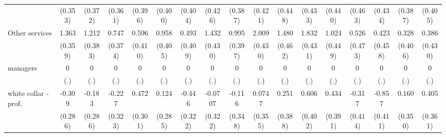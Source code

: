 {\begin{tabular}{l*{16}{c}}
                    &     (0.353)         &     (0.372)         &     (0.361)         &     (0.396)         &     (0.400)         &     (0.404)         &     (0.426)         &     (0.387)         &     (0.421)         &     (0.448)         &     (0.433)         &     (0.440)         &     (0.463)         &     (0.434)         &     (0.387)         &     (0.405)         \\
[1em]
Other services      &       1.363\sym{***}&       1.212\sym{**} &       0.747\sym{*}  &       0.596         &       0.958\sym{*}  &       0.493         &       1.432\sym{***}&       0.995\sym{*}  &       2.009\sym{***}&       1.480\sym{**} &       1.832\sym{***}&       1.024\sym{*}  &       0.526         &       0.423         &       0.328         &       0.386         \\
                    &     (0.359)         &     (0.383)         &     (0.374)         &     (0.410)         &     (0.405)         &     (0.409)         &     (0.430)         &     (0.397)         &     (0.430)         &     (0.462)         &     (0.431)         &     (0.449)         &     (0.473)         &     (0.458)         &     (0.406)         &     (0.430)         \\
[1em]
managers            &           0         &           0         &           0         &           0         &           0         &           0         &           0         &           0         &           0         &           0         &           0         &           0         &           0         &           0         &           0         &           0         \\
                    &         (.)         &         (.)         &         (.)         &         (.)         &         (.)         &         (.)         &         (.)         &         (.)         &         (.)         &         (.)         &         (.)         &         (.)         &         (.)         &         (.)         &         (.)         &         (.)         \\
[1em]
white collar - prof.&      -0.309         &      -0.183         &      -0.227         &       0.472         &       0.124         &      -0.446         &     -0.0707         &      -0.116         &      0.0747         &       0.251         &       0.606         &       0.434         &      -0.317         &      -0.857\sym{*}  &       0.160         &       0.405         \\
                    &     (0.286)         &     (0.286)         &     (0.323)         &     (0.301)         &     (0.285)         &     (0.322)         &     (0.322)         &     (0.348)         &     (0.355)         &     (0.388)         &     (0.402)         &     (0.391)         &     (0.414)         &     (0.411)         &     (0.350)         &     (0.361)         \\

\end{tabular}}
